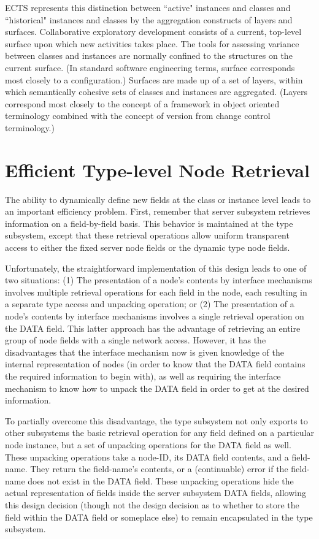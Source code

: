 ECTS represents this distinction between ``active" instances and
classes and ``historical" instances and classes by the aggregation
constructs of layers and surfaces.  Collaborative exploratory
development consists of a current, top-level surface upon which new
activities takes place.  The tools for assessing variance between
classes and instances are normally confined to the structures on the
current surface.  (In standard software engineering terms, surface
corresponds most closely to a configuration.)  Surfaces are made up of
a set of layers, within which semantically cohesive sets of classes
and instances are aggregated.  (Layers correspond most closely to the
concept of a framework in object oriented terminology combined with
the concept of version from change control terminology.)


\section{Efficient Type-level Node Retrieval}
\label{app:net}

The ability to dynamically define new fields at the class or instance
level leads to an important efficiency problem.  First, remember that
server subsystem retrieves information on a field-by-field basis.
This behavior is maintained at the type subsystem, except that these
retrieval operations allow uniform transparent access to either the
fixed server node fields or the dynamic type node fields.

Unfortunately, the straightforward implementation of this design leads
to one of two situations: (1) The presentation of a node's contents by
interface mechanisms involves multiple retrieval operations for each
field in the node, each resulting in a separate type access and
unpacking operation; or (2) The presentation of a node's contents by
interface mechanisms involves a single retrieval operation on the DATA
field.  This latter approach has the advantage of retrieving an entire
group of node fields with a single network access.  However, it has
the disadvantages that the interface mechanism now is given knowledge
of the internal representation of nodes (in order to know that the
DATA field contains the required information to begin with), as well
as requiring the interface mechanism to know how to unpack the DATA
field in order to get at the desired information.

To partially overcome this disadvantage, the type subsystem not only
exports to other subsystems the basic retrieval operation for any
field defined on a particular node instance, but a set of unpacking
operations for the DATA field as well.  These unpacking operations
take a node-ID, its DATA field contents, and a field-name. They return
the field-name's contents, or a (continuable) error if the field-name
does not exist in the DATA field.    These
unpacking operations hide the actual representation of fields inside
the server subsystem DATA fields, allowing this design decision
(though not the design decision as to whether to store the field
within the DATA field or someplace else) to remain encapsulated in the
type subsystem.

